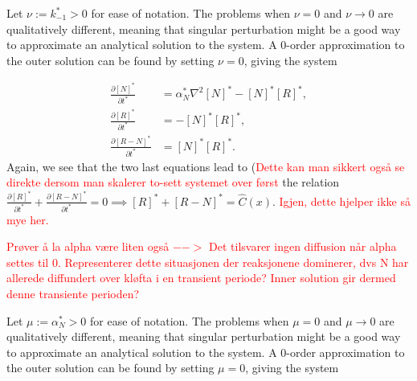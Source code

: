 \documentclass{article}
\begin{document}

Let $\nu := k_{-1}^* > 0$ for ease of notation. The problems when $\nu = 0$ and $\nu \rightarrow 0$ are qualitatively different, meaning that singular perturbation might be a good way to approximate an analytical solution to the system. A 0-order approximation to the outer solution can be found by setting $\nu = 0$, giving the system 

\begin{align}
    \frac{\partial [N]^*}{\partial t^*} &= \alpha_N^*\nabla^2[N]^*- [N]^*[R]^* ,\\
    \frac{\partial [R]^*}{\partial t^*} &= - [N]^*[R]^*,\\
    \frac{\partial [R-N]^*}{\partial t^*} &= [N]^*[R]^*.
\end{align}
Again, we see that the two last equations lead to (\textcolor{red}{Dette kan man sikkert også se direkte dersom man skalerer to-sett systemet over først} the relation $\frac{\partial [R]^*}{\partial t^*} + \frac{\partial [R-N]^*}{\partial t^*} = 0 \implies [R]^* + [R-N]^* = \hat{C}(x)$. \textcolor{red}{Igjen, dette hjelper ikke så mye her.}

\textcolor{red}{Prøver å la alpha være liten også $-->$ Det tilsvarer ingen diffusion når alpha settes til 0. Representerer dette situasjonen der reaksjonene dominerer, dvs N har allerede diffundert over kløfta i en transient periode? Inner solution gir dermed denne transiente perioden?}

Let $\mu := \alpha_N^* > 0$ for ease of notation. The problems when $\mu = 0$ and $\mu \rightarrow 0$ are qualitatively different, meaning that singular perturbation might be a good way to approximate an analytical solution to the system. A 0-order approximation to the outer solution can be found by setting $\mu = 0$, giving the system 
\end{document}
